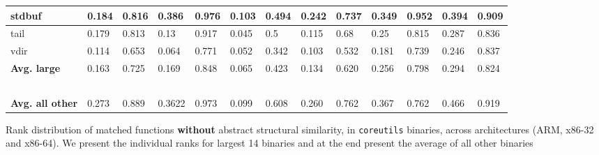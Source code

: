 \begin{appendices}
\begin{table}[!ht]
\begin{center}
\begin{tabular}{ | l | l | l | l | l | l | l | l | l | l | l | l | l | }
	stdbuf & 0.184 & 0.816 & 0.386 & 0.976 & 0.103 & 0.494 & 0.242 & 0.737 & 0.349 & 0.952 & 0.394 & 0.909 \\ \hline
	tail & 0.179 & 0.813 & 0.13 & 0.917 & 0.045 & 0.5 & 0.115 & 0.68 & 0.25 & 0.815 & 0.287 & 0.836 \\ \hline
	vdir & 0.114 & 0.653 & 0.064 & 0.771 & 0.052 & 0.342 & 0.103 & 0.532 & 0.181 & 0.739 & 0.246 & 0.837 \\ \hline
	\textbf{Avg. large} & 0.163 & 0.725 & 0.169 & 0.848 & 0.065 & 0.423 & 0.134 & 0.620 & 0.256 & 0.798 & 0.294 & 0.824 \\ \hline
	\  & \  & \  & \  & \  & \  & \  & \  & \  & \  & \  & \  & \  \\ \hline
	\textbf{Avg. all other} & 0.273 & 0.889 & 0.3622 & 0.973 & 0.099 & 0.608 & 0.260 & 0.762 & 0.367 & 0.762 & 0.466 & 0.919 \\ \hline

\end{tabular}
\end{center}
\end{table}


\begin{table}[!ht]
	\begin{center}
		\caption{Rank distribution of matched functions \textbf{without} abstract structural similarity, in \texttt{coreutils} binaries, across architectures (ARM, x86-32 and x86-64). We present the individual ranks for largest 14 binaries and at the end present the average of all other binaries \\}
		\label{tab:cross-arch-no-behav}
		\scriptsize


\end{center}
\end{table}
\end{appendices}
